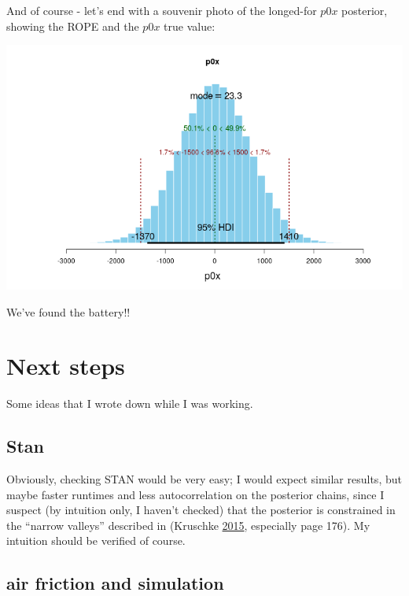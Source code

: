 \documentclass[]{article}
\begin{document}
And of course - let's end with a souvenir photo of the longed-for
\(p0x\) posterior, showing the ROPE and the \(p0x\) true value:

\begin{center}\includegraphics[width=1.0\textwidth]{bayesian_artillery_files/figure-latex/jags_posterior-1} \end{center}

We've found the battery!!

\hypertarget{next-steps}{%
\section{Next steps}\label{next-steps}}

Some ideas that I wrote down while I was working.

\hypertarget{stan}{%
\subsection{Stan}\label{stan}}

Obviously, checking STAN would be very easy; I would expect similar
results, but maybe faster runtimes and less autocorrelation on the
posterior chains, since I suspect (by intuition only, I haven't checked)
that the posterior is constrained in the ``narrow valleys'' described in
(Kruschke \protect\hyperlink{ref-DBDA2E}{2015}, especially page 176). My
intuition should be verified of course.

\hypertarget{air-friction-and-simulation}{%
\subsection{air friction and
simulation}\label{air-friction-and-simulation}}
\end{document}
